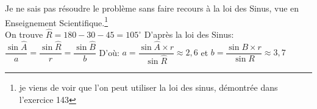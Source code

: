 \documentclass[12pt, a4paper]{article}
\begin{document}
\begin{Exercise}[number={146}]
  \begin{minipage}{\dimexpr\textwidth-10px-\parindent\relax}
  \medbreak Je ne sais pas résoudre le problème sans faire recours à la loi des Sinus, vue en Enseignement Scientifique.\footnote{je viens de voir que l'on peut utiliser la loi des sinus, démontrée dans l'exercice 143} \\
  On trouve $\widehat{R}=180-30-45=105^{\circ}$ \bigbreak
  D'après la loi des Sinus: \qquad $\dfrac{\sin{\widehat{A}}}{a}=\dfrac{\sin{\widehat{R}}}{r}=\dfrac{\sin{\widehat{B}}}{b}$ \medbreak
  D'où: \quad $a=\dfrac{\sin{\widehat{A}\times r}}{\sin{\widehat{R}}}\approx 2{,}6$ \quad et \quad $b=\dfrac{\sin{B}\times r}{\sin{R}}\approx 3{,}7$
  \end{minipage}
\end{Exercise}
\end{document}
